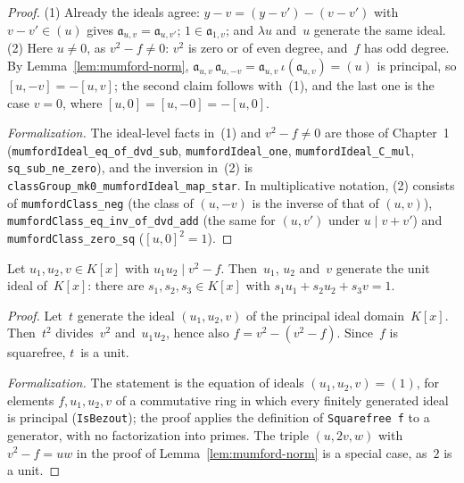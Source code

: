 \begin{proof}
\leanok
{}
(1) Already the ideals agree: $y - v = (y - v') - (v - v')$ with $v - v' \in (u)$ gives
$\mathfrak a_{u,v} = \mathfrak a_{u,v'}$; $1 \in \mathfrak a_{1,v}$; and $\lambda u$ and~$u$
generate the same ideal. (2) Here $u \ne 0$, as $v^2 - f \ne 0$: $v^2$ is zero or of even degree,
and~$f$ has odd degree. By Lemma~\ref{lem:mumford-norm},
$\mathfrak a_{u,v}\,\mathfrak a_{u,-v} = \mathfrak a_{u,v}\,\iota(\mathfrak a_{u,v}) = (u)$ is
principal, so $[u, -v] = -[u, v]$; the second claim follows with~(1), and the last one is the case
$v = 0$, where $[u, 0] = [u, -0] = -[u, 0]$.

\emph{Formalization.} The ideal-level facts in~(1) and $v^2 - f \ne 0$ are those of Chapter~1
(\texttt{mumfordIdeal\_eq\_of\_dvd\_sub}, \texttt{mumfordIdeal\_one},
\texttt{mumfordIdeal\_C\_mul}, \texttt{sq\_sub\_ne\_zero}), and the inversion in~(2) is
\texttt{classGroup\_mk0\_mumfordIdeal\_map\_star}. In multiplicative notation, (2) consists of
\texttt{mumfordClass\_neg} (the class of $(u, -v)$ is the inverse of that of $(u, v)$),
\texttt{mumfordClass\_eq\_inv\_of\_dvd\_add} (the same for $(u, v')$ under $u \mid v + v'$) and
\texttt{mumfordClass\_zero\_sq} ($[u, 0]^2 = 1$).
\end{proof}

\begin{lemma}
\label{lem:hv-bezout}
\leanok
Let $u_1, u_2, v \in K[x]$ with $u_1 u_2 \mid v^2 - f$. Then~$u_1$, $u_2$ and~$v$ generate the
unit ideal of~$K[x]$: there are $s_1, s_2, s_3 \in K[x]$ with $s_1 u_1 + s_2 u_2 + s_3 v = 1$.
\end{lemma}

\begin{proof}
\leanok
Let~$t$ generate the ideal $(u_1, u_2, v)$ of the principal ideal domain~$K[x]$. Then~$t^2$
divides~$v^2$ and~$u_1 u_2$, hence also $f = v^2 - (v^2 - f)$. Since~$f$ is squarefree, $t$~is a
unit.

\emph{Formalization.} The statement is the equation of ideals $(u_1, u_2, v) = (1)$, for elements
$f, u_1, u_2, v$ of a commutative ring in which every finitely generated ideal is principal
(\texttt{IsBezout}); the proof applies the definition of \texttt{Squarefree f} to a generator,
with no factorization into primes. The triple $(u, 2v, w)$ with $v^2 - f = uw$ in the proof of
Lemma~\ref{lem:mumford-norm} is a special case, as~$2$ is a unit.
\end{proof}


